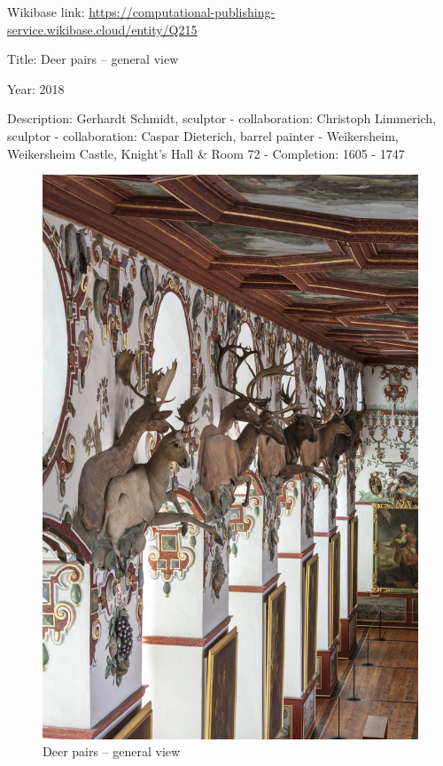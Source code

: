 \documentclass[
  letterpaper,
]{book}
\begin{document}
Wikibase link:
\url{https://computational-publishing-service.wikibase.cloud/entity/Q215}

Title: Deer pairs -- general view

Year: 2018

Description: Gerhardt Schmidt, sculptor - collaboration: Christoph
Limmerich, sculptor - collaboration: Caspar Dieterich, barrel painter -
Weikersheim, Weikersheim Castle, Knight's Hall \& Room 72 - Completion:
1605 - 1747

\begin{figure}[H]

{\centering \includegraphics{impressum_files/mediabag/fmd10005866a.jpg}

}

\caption{Deer pairs -- general view}

\end{figure}%
\end{document}
